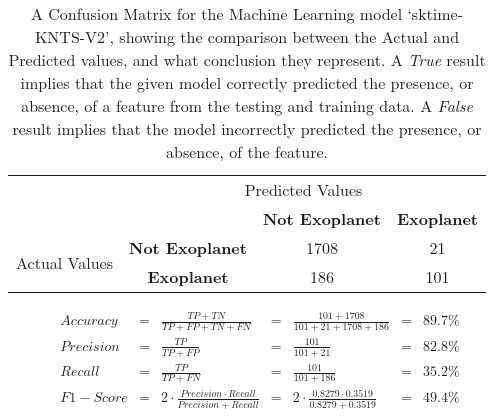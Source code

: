 
    \renewcommand{\arraystretch}{2}
    \renewcommand{\tabcolsep}{20.25pt}
    \vspace{-0.5cm}
    \begin{table}[ht]
    \begin{tabular}{cccc}
     & \multicolumn{3}{c}{Predicted Values} \\ \cline{3-4}
     & \multicolumn{1}{c|}{} & \multicolumn{1}{c|}{\textbf{Not Exoplanet}} & \multicolumn{1}{c|}{\textbf{Exoplanet}} \\ \cline{2-4}
    \multicolumn{1}{c|}{\multirow{2}{2.0cm}{Actual Values}} & \multicolumn{1}{c|}{\textbf{Not Exoplanet}} & \multicolumn{1}{c|}{1708} & \multicolumn{1}{c|}{21} \\ \cline{2-4}
    \multicolumn{1}{c|}{} & \multicolumn{1}{c|}{\textbf{Exoplanet}} & \multicolumn{1}{c|}{186} & \multicolumn{1}{c|}{101} \\ \cline{2-4}
    \end{tabular}
    \caption{A Confusion Matrix for the Machine Learning model `sktime-KNTS-V2', showing the comparison between the Actual and Predicted values, and what conclusion they represent. A \emph{True} result implies that the given model correctly predicted the presence, or absence, of a feature from the testing and training data. A \emph{False} result implies that the model incorrectly predicted the presence, or absence, of the feature.}
    \label{tab:sktime-KNTS-V2confusionmatrix}
    \end{table}
    \vspace{-0.75cm}
    \label{eq:metrics-sktime-KNTS-V2}
    \begin{align*}
        Accuracy &= &\frac{TP + TN}{TP + FP + TN + FN} &= &\frac{101 + 1708}{101 + 21 + 1708 + 186} &= & 89.7\% \\
        Precision &= &\frac{TP}{TP + FP} &= &\frac{101}{101 + 21} &= & 82.8\% \\
        Recall &= &\frac{TP}{TP + FN} &= &\frac{101}{101 + 186} &= & 35.2\% \\
        F1-Score &= &2 \cdot \frac{Precision \cdot Recall}{Precision + Recall} &= &2 \cdot \frac{0.8279 \cdot 0.3519}{0.8279 + 0.3519} &= & 49.4\% \\
    \end{align*}
    \vspace{-1.75cm}
    \renewcommand{\arraystretch}{1}
    \renewcommand{\tabcolsep}{5.25pt}
    